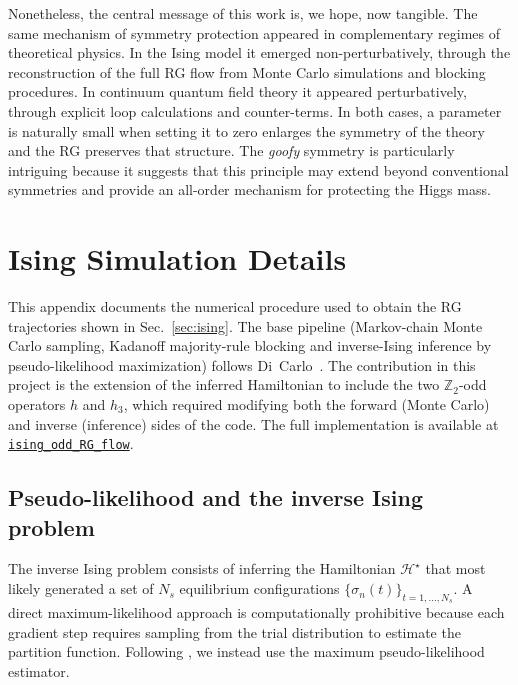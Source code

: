 \documentclass[a4paper, 11pt]{article}
\begin{document}
Nonetheless, the central message of this work is, we hope, now tangible. The same mechanism of symmetry protection appeared in complementary regimes of theoretical physics. In the Ising model it emerged non-perturbatively, through the reconstruction of the full RG flow from Monte Carlo simulations and blocking procedures. In continuum quantum field theory it appeared perturbatively, through explicit loop calculations and counter-terms. In both cases, a parameter is naturally small when setting it to zero enlarges the symmetry of the theory and the RG preserves that structure. The \textit{goofy} symmetry is particularly intriguing because it suggests that this principle may extend beyond conventional symmetries and provide an all-order mechanism for protecting the Higgs mass.
\newpage

\appendix
\section{Ising Simulation Details}
\label{Ising_appendix}

This appendix documents the numerical procedure used to obtain the
RG trajectories shown in Sec.~\ref{sec:ising}. The base pipeline (Markov-chain Monte Carlo sampling, Kadanoff majority-rule blocking and inverse-Ising inference by pseudo-likelihood maximization) follows Di~Carlo~\cite{blocking}. The contribution in this project is the extension of the inferred Hamiltonian to include the two $\mathbb{Z}_2$-odd operators $h$ and $h_3$, which required modifying both the forward (Monte Carlo) and inverse (inference) sides of the code. The full implementation is available at \href{https://github.com/juanagranadosr/ising_odd_RG_flow}%
{\texttt{ising\_odd\_RG\_flow}}.


\subsection{Pseudo-likelihood and the inverse Ising problem}
\label{app:pseudo_likelihood}

The inverse Ising problem consists of inferring the Hamiltonian $\mathcal{H}^\star$ that most likely generated a set of $N_s$ equilibrium configurations $\{\sigma_n(t)\}_{t=1,\dots,N_s}$. A direct maximum-likelihood approach is computationally prohibitive because each gradient step requires sampling from the trial distribution to estimate the partition function. Following \cite{blocking}, we instead use the maximum pseudo-likelihood estimator.
\end{document}
